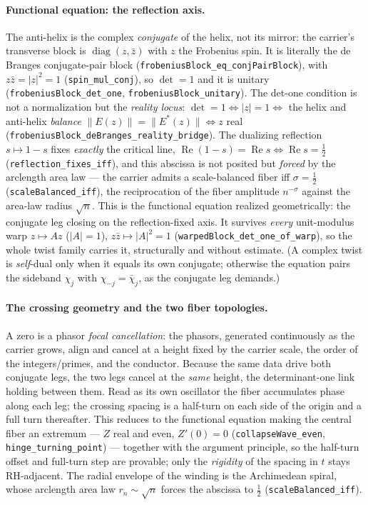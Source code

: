 \documentclass[11pt]{article}
\theoremstyle{definition}
\renewcommand{\Re}{\operatorname{Re}}
\begin{document}
\paragraph{Functional equation: the reflection axis.} The anti-helix is the complex \emph{conjugate}
of the helix, not its mirror: the carrier's transverse block is $\operatorname{diag}(z,\bar z)$ with
$z$ the Frobenius spin. It is literally the de Branges conjugate-pair block
(\texttt{frobeniusBlock\_eq\_conjPairBlock}), with $z\bar z=|z|^2=1$ (\texttt{spin\_mul\_conj}), so
$\det=1$ and it is unitary (\texttt{frobeniusBlock\_det\_one}, \texttt{frobeniusBlock\_unitary}). The
det-one condition is not a normalization but the \emph{reality locus}:
$\det=1\iff|z|=1\iff$ the helix and anti-helix \emph{balance} $\|E(z)\|=\|E^{*}(z)\|\iff z$ real
(\texttt{frobeniusBlock\_deBranges\_reality\_bridge}). The dualizing reflection $s\mapsto1-s$ fixes
\emph{exactly} the critical line, $\Re(1-s)=\Re s\iff\Re s=\tfrac12$ (\texttt{reflection\_fixes\_iff}),
and this abscissa is not posited but \emph{forced} by the arclength area law --- the carrier admits a
scale-balanced fiber iff $\sigma=\tfrac12$ (\texttt{scaleBalanced\_iff}), the reciprocation of the
fiber amplitude $n^{-\sigma}$ against the area-law radius $\sqrt n$. This is the functional equation
realized geometrically: the conjugate leg closing on the reflection-fixed axis. It survives
\emph{every} unit-modulus warp $z\mapsto Az$ ($|A|=1$), $z\bar z\mapsto|A|^2=1$
(\texttt{warpedBlock\_det\_one\_of\_warp}), so the whole twist family carries it, structurally and
without estimate. (A complex twist is \emph{self}-dual only when it equals its own conjugate;
otherwise the equation pairs the sideband $\chi_j$ with $\chi_{-j}=\bar\chi_j$, as the conjugate leg
demands.)

\paragraph{The crossing geometry and the two fiber topologies.} A zero is a phasor \emph{focal
cancellation}: the phasors, generated continuously as the carrier grows, align and cancel at a height
fixed by the carrier scale, the order of the integers/primes, and the conductor. Because the same data
drive both conjugate legs, the two legs cancel at the \emph{same} height, the determinant-one link
holding between them. Read as its own oscillator the fiber accumulates phase along each leg; the
crossing spacing is a half-turn on each side of the origin and a full turn thereafter. This reduces to
the functional equation making the central fiber an extremum --- $Z$ real and even, $Z'(0)=0$
(\texttt{collapseWave\_even}, \texttt{hinge\_turning\_point}) --- together with the argument principle,
so the half-turn offset and full-turn step are provable; only the \emph{rigidity} of the spacing in $t$
stays RH-adjacent. The radial envelope of the winding is the Archimedean spiral, whose arclength area
law $r_n\sim\sqrt n$ forces the abscissa to $\tfrac12$ (\texttt{scaleBalanced\_iff}).
\end{document}
